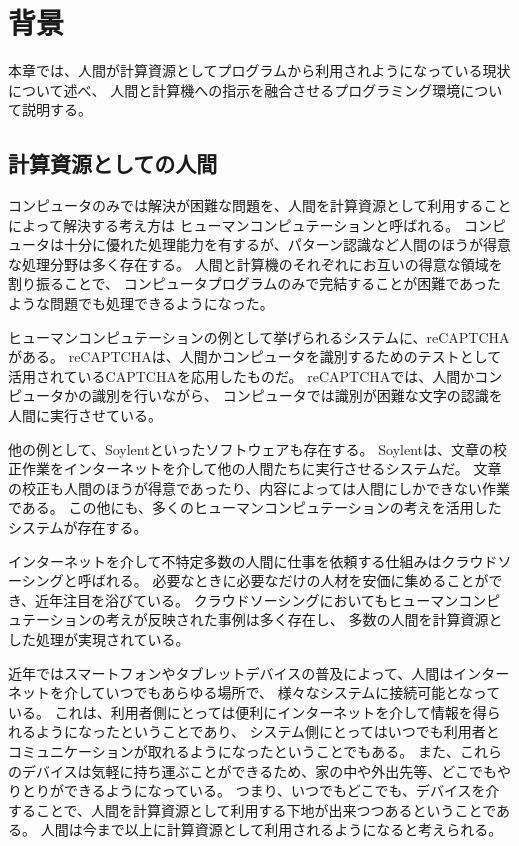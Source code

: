 \chapter{背景}\label{chap:background}

本章では、人間が計算資源としてプログラムから利用されようになっている現状について述べ、
人間と計算機への指示を融合させるプログラミング環境について説明する。

\newpage

\section{計算資源としての人間}\label{sec:human-as-computational-resources}

コンピュータのみでは解決が困難な問題を、人間を計算資源として利用することによって解決する考え方は
ヒューマンコンピュテーション\cite{humancomputation}と呼ばれる。
コンピュータは十分に優れた処理能力を有するが、パターン認識など人間のほうが得意な処理分野は多く存在する。
人間と計算機のそれぞれにお互いの得意な領域を割り振ることで、
コンピュータプログラムのみで完結することが困難であったような問題でも処理できるようになった。

ヒューマンコンピュテーションの例として挙げられるシステムに、reCAPTCHA\cite{recaptcha}がある。
reCAPTCHAは、人間かコンピュータを識別するためのテストとして活用されているCAPTCHA\cite{captcha}を応用したものだ。
reCAPTCHAでは、人間かコンピュータかの識別を行いながら、
コンピュータでは識別が困難な文字の認識を人間に実行させている。

他の例として、Soylent\cite{soylent}といったソフトウェアも存在する。
Soylentは、文章の校正作業をインターネットを介して他の人間たちに実行させるシステムだ。
文章の校正も人間のほうが得意であったり、内容によっては人間にしかできない作業である。
この他にも、多くのヒューマンコンピュテーションの考えを活用したシステムが存在する。

インターネットを介して不特定多数の人間に仕事を依頼する仕組みはクラウドソーシング\cite{riseofcrowdsourcing}と呼ばれる。
必要なときに必要なだけの人材を安価に集めることができ、近年注目を浴びている。
クラウドソーシングにおいてもヒューマンコンピュテーションの考えが反映された事例は多く存在し、
多数の人間を計算資源とした処理が実現されている。

近年ではスマートフォンやタブレットデバイスの普及によって、人間はインターネットを介していつでもあらゆる場所で、
様々なシステムに接続可能となっている。
これは、利用者側にとっては便利にインターネットを介して情報を得られるようになったということであり、
システム側にとってはいつでも利用者とコミュニケーションが取れるようになったということでもある。
また、これらのデバイスは気軽に持ち運ぶことができるため、家の中や外出先等、どこでもやりとりができるようになっている。
つまり、いつでもどこでも、デバイスを介することで、人間を計算資源として利用する下地が出来つつあるということである。
人間は今まで以上に計算資源として利用されるようになると考えられる。

